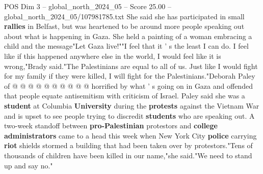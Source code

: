 \begin{textsample}{POS Dim 3 – global\_north\_2024\_05 – Score 25.00 – global\_north\_2024\_05/107981785.txt}
She said she has participated in small \textbf{rallies} in Belfast, but was heartened to be around more people speaking out about what is happening in Gaza.
She held a painting of a woman embracing a child and the message"Let Gaza live!""I feel that it ' s the least I can do.
I feel like if this happened anywhere else in the world, I would feel like it is wrong,"Brady said."The Palestinians are equal to all of us.
Just like I would fight for my family if they were killed, I will fight for the Palestinians."Deborah Paley of @ @ @ @ @ @ @ @ @ @ horrified by what ' s going on in Gaza and offended that people equate antisemitism with criticism of Israel.
Paley said she was a \textbf{student} at Columbia \textbf{University} during the \textbf{protests} against the Vietnam War and is upset to see people trying to discredit \textbf{students} who are speaking out.
A two-week standoff between \textbf{pro-Palestinian} protestors and \textbf{college} \textbf{administrators} came to a head this week when New York City \textbf{police} carrying \textbf{riot} shields stormed a building that had been taken over by protestors."Tens of thousands of children have been killed in our name,"she said."We need to stand up and say no."

\end{textsample}
